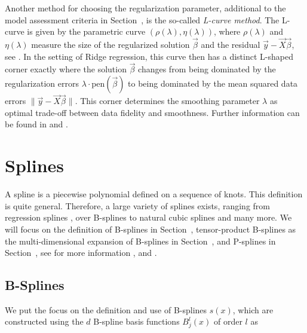 Another method for choosing the regularization parameter, additional to the model assessment criteria in Section~, is the so-called \emph{L-curve method}. The L-curve is given by the parametric curve $(\rho(\lambda), \eta(\lambda))$, where $\rho(\lambda)$ and $\eta(\lambda)$ measure the size of the regularized solution $\vec{\beta}$ and the residual $\vec{y} - \vec{X} \vec{\beta}$, see \cite{hansen1993use}. In the setting of Ridge regression, this curve then has a distinct L-shaped corner exactly where the solution $\vec{\beta}$ changes from being dominated by the regularization errors $\lambda \cdot \mathrm{pen}(\vec{\beta})$ to being dominated by the mean squared data errors $\lVert \vec{y} - \vec{X} \vec{\beta} \rVert$. This corner determines the smoothing parameter $\lambda$ as optimal trade-off between data fidelity and smoothness. Further information can be found in \cite{hansen1993use} and \cite{hansen1992analysis}.


\section{Splines} \label{sec:Splines}
	
A spline is a piecewise polynomial defined on a sequence of knots. This definition is quite general. Therefore, a large variety of splines exists, ranging from regression splines \cite{eubank1990regressionsplines}, over B-splines \cite{deBoor1978practicalGuideToSplines} to natural cubic splines and many more. We will focus on the definition of B-splines in Section~, tensor-product B-splines as the multi-dimensional expansion of B-splines in Section~, and P-splines in Section~, see for more information \cite{fahrmeir2007regression}, \cite{deBoor1978practicalGuideToSplines} and \cite{eilers1996flexible}.
\subsection{B-Splines} \label{subsec:b-splines}

We put the focus on the definition and use of B-splines $s(x)$, which are constructed using the $d$ B-spline basis functions $B_j^l(x)$ of order $l$ as

